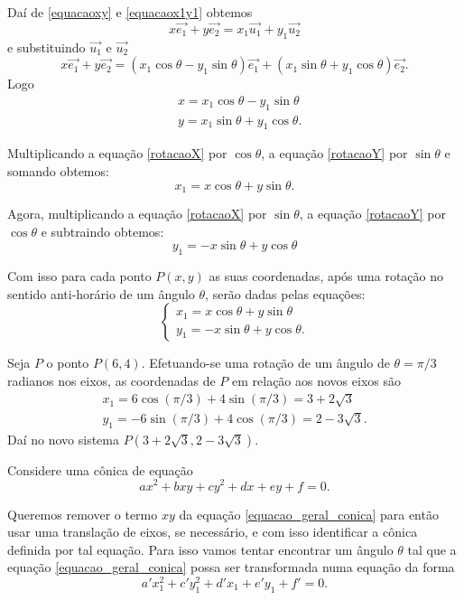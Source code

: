 Daí de \eqref{equacaoxy} e \eqref{equacaox1y1} obtemos
\[
    x\vec{e_1} + y\vec{e_2} = x_1\vec{u_1} + y_1\vec{u_2}
\]
e substituindo $\vec{u_1}$ e $\vec{u_2}$
\[
    x\vec{e_1} + y\vec{e_2} = (x_1\cos\theta - y_1\sin\theta)\vec{e_1} + (x_1\sin\theta + y_1\cos\theta)\vec{e_2}.
\]
Logo
\begin{align}
     & x = x_1\cos\theta - y_1\sin\theta\label{rotacaoX}  \\
     & y = x_1\sin\theta + y_1\cos\theta\label{rotacaoY}.
\end{align}

Multiplicando a equação \eqref{rotacaoX} por $\cos\theta$, a equação \eqref{rotacaoY} por $\sin\theta$ e somando obtemos:
\[
    x_1 = x\cos\theta + y\sin\theta.
\]

Agora, multiplicando a equação \eqref{rotacaoX} por $\sin\theta$, a equação \eqref{rotacaoY} por $\cos\theta$ e subtraindo obtemos:
\[
    y_1 = -x\sin\theta + y\cos\theta
\]

Com isso para cada ponto $P(x,y)$ as suas coordenadas, após uma rotação no sentido anti-horário de um ângulo $\theta$, serão dadas pelas equações:
\[
    \begin{cases}
        x_1 = x\cos\theta + y\sin\theta \\
        y_1 = -x\sin\theta + y\cos\theta.
    \end{cases}
\]

\begin{exemplos}
    Seja $P$ o ponto $P(6,4)$. Efetuando-se uma rotação de um ângulo de $\theta = \pi/3$ radianos nos eixos, as coordenadas de $P$ em relação aos novos
    eixos são
    \begin{align*}
        x_1 = 6\cos(\pi/3) + 4\sin(\pi/3) = 3 + 2\sqrt{3} \\
        y_1 = -6\sin(\pi/3) + 4\cos(\pi/3) = 2 - 3\sqrt{3}.
    \end{align*}
    Daí no novo sistema $P(3 + 2\sqrt{3}, 2 - 3\sqrt{3})$.
\end{exemplos}

Considere uma cônica de equação
\begin{equation}\label{equacao_geral_conica}
    ax^2 + bxy + cy^2 + dx + ey + f = 0.
\end{equation}

Queremos remover o termo $xy$ da equação \eqref{equacao_geral_conica} para então usar uma translação de eixos, se necessário, e com isso identificar a
cônica definida por tal equação. Para isso vamos tentar encontrar um ângulo $\theta$ tal que a equação \eqref{equacao_geral_conica} possa ser transformada
numa equação da forma
\begin{equation}\label{equacao_rotacionada_conica}
    a'x_1^2 + c'y_1^2 + d'x_1 + e'y_1 + f' = 0.
\end{equation}

